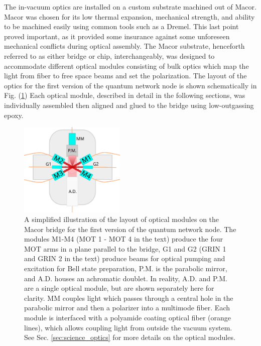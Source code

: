 The in-vacuum optics are installed on a custom substrate  machined out of Macor. Macor was chosen for its low thermal expansion, mechanical strength, and ability to be machined easily using common tools such as a Dremel. This last point proved important, as it provided some insurance against some unforeseen mechanical conflicts during optical assembly. The Macor substrate, henceforth referred to as either bridge or chip, interchangeably, was designed to accommodate different optical modules consisting of bulk optics which map the light from fiber to free space beams and set the polarization. The layout of the optics for the first version of the quantum network node is shown schematically in Fig. (\ref{fig:optical_chip_design}) Each optical module, described in detail in the following sections, was individually assembled then aligned and glued to the bridge using low-outgassing epoxy. 

\begin{figure}[!ht]
    \centering
    \includegraphics[width=0.45\textwidth]{Images/optical_chip_schematic.pdf}
    \caption{A simplified illustration of the layout of optical modules on the Macor bridge for the first version of the quantum network node. The modules M1-M4 (MOT 1 - MOT 4 in the text) produce the four MOT arms in a plane parallel to the bridge, G1 and G2 (GRIN 1 and GRIN 2 in the text) produce beams for optical pumping and excitation for Bell state preparation, P.M. is the parabolic mirror, and A.D. houses an achromatic doublet. In reality, A.D. and P.M. are a single optical module, but are shown separately here for clarity. MM couples light which passes through a central hole in the parabolic mirror and then a polarizer into a multimode fiber. Each module is interfaced with a polyamide coating optical fiber (orange lines), which allows coupling  light from outside the vacuum system. See Sec. \ref{sec:science_optics} for more details on the optical modules.}
    \label{fig:optical_chip_design}
\end{figure}

